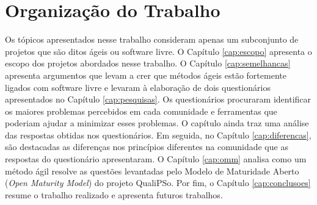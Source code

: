 \section{Organização do Trabalho}
\label{sec:organizacao_trabalho}

Os tópicos apresentados nesse trabalho consideram apenas um
subconjunto de projetos que são ditos ágeis ou software livre. O
Capítulo \ref{cap:escopo} apresenta o escopo dos projetos abordados
nesse trabalho. O Capítulo \ref{cap:semelhancas} apresenta argumentos
que levam a crer que métodos ágeis estão fortemente ligados com
software livre e levaram à elaboração de dois questionários
apresentados no Capítulo \ref{cap:pesquisas}. Os questionários
procuraram identificar os maiores problemas percebidos em cada
comunidade e ferramentas que poderiam ajudar a minimizar esses
problemas. O capítulo ainda traz uma análise das respostas obtidas nos
questionários.  Em seguida, no Capítulo \ref{cap:diferencas}, são
destacadas as diferenças nos princípios diferentes na comunidade que
as respostas do questionário apresentaram. O Capítulo \ref{cap:omm}
analisa como um método ágil resolve as questões levantadas pelo Modelo
de Maturidade Aberto ({\it Open Maturity Model}) do projeto QualiPSo.
Por fim, o Capítulo \ref{cap:conclusoes} resume o trabalho realizado e
apresenta futuros trabalhos.
